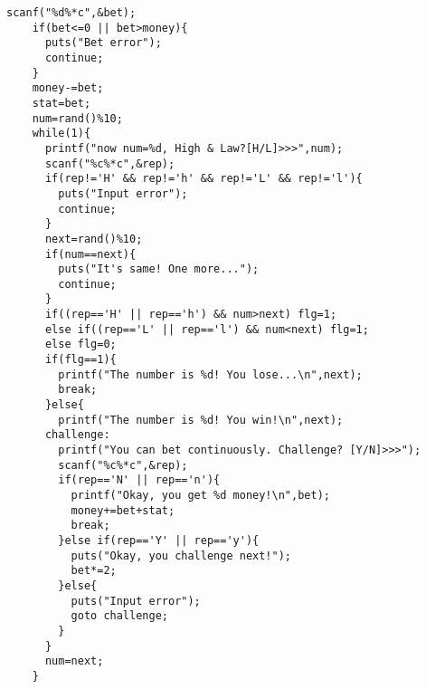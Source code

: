 \begin{boxnote}
\addtocounter{lstlisting}{-1}
\begin{lstlisting}[caption=ハイ\&ロー(続き),firstnumber=12]
    scanf("%d%*c",&bet);
    if(bet<=0 || bet>money){
      puts("Bet error");
      continue;
    }
    money-=bet;
    stat=bet;
    num=rand()%10;
    while(1){
      printf("now num=%d, High & Law?[H/L]>>>",num);
      scanf("%c%*c",&rep);
      if(rep!='H' && rep!='h' && rep!='L' && rep!='l'){
        puts("Input error");
        continue;
      }
      next=rand()%10;
      if(num==next){
        puts("It's same! One more...");
        continue;
      }
      if((rep=='H' || rep=='h') && num>next) flg=1;
      else if((rep=='L' || rep=='l') && num<next) flg=1;
      else flg=0;
      if(flg==1){
        printf("The number is %d! You lose...\n",next);
        break;
      }else{
        printf("The number is %d! You win!\n",next);
      challenge:
        printf("You can bet continuously. Challenge? [Y/N]>>>");
        scanf("%c%*c",&rep);
        if(rep=='N' || rep=='n'){
          printf("Okay, you get %d money!\n",bet);
          money+=bet+stat;
          break;
        }else if(rep=='Y' || rep=='y'){
          puts("Okay, you challenge next!");
          bet*=2;
        }else{
          puts("Input error");
          goto challenge;
        }
      }
      num=next;
    }
\end{lstlisting}
\end{boxnote}

